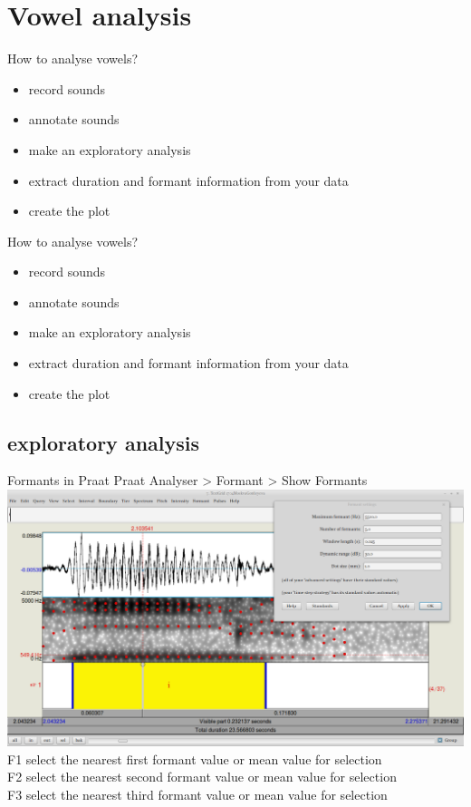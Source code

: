 \section{Vowel analysis}
\begin{frame}{How to analyse vowels?}
\begin{itemize}
\item record sounds
\item annotate sounds
\item make an exploratory analysis
\item extract duration and formant information from your data
\item create the plot
\end{itemize}
\end{frame}

\begin{frame}{How to analyse vowels?}
\begin{itemize}
\item[\checkmark] record sounds
\item[\checkmark] annotate sounds
\item make an exploratory analysis
\item extract duration and formant information from your data
\item create the plot
\end{itemize}
\end{frame}

\subsection{exploratory analysis}
\begin{frame}{Formants in Praat}
Praat Analyser > Formant > Show Formants\\
\includegraphics[width=\linewidth]{05-formnats.png}\\
F1 \hfill select the nearest first formant value or mean value for selection\\
F2 \hfill select the nearest second formant value or mean value for selection\\
F3 \hfill select the nearest third formant value or mean value for selection\\
\end{frame}

